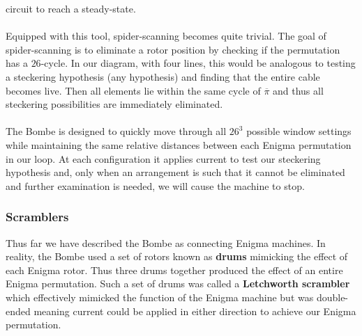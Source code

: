 circuit to reach
a steady-state.
\\\\Equipped with this tool, spider-scanning becomes quite trivial.
The goal of spider-scanning is to eliminate a rotor position by
checking if the permutation has a $26$-cycle. In our diagram, with four lines,
this would be analogous to testing a steckering hypothesis (any
hypothesis) and finding that the entire cable becomes live. Then all
elements lie within the same cycle of $\overline\pi$ and thus all
steckering possibilities are immediately eliminated.
\\\\The Bombe is designed to quickly move through all $26^3$ possible
window settings while maintaining the same relative distances between
each Enigma permutation in our loop. At each configuration
it applies current to test our steckering hypothesis and, only when
an arrangement is such that it
cannot be eliminated and further examination is needed, we will cause
the machine to stop.

\subsubsection{Scramblers}
Thus far we have described the Bombe as connecting Enigma machines.
In reality, the Bombe used a set of rotors known as {\bf{drums}}
mimicking the effect of each Enigma rotor. Thus three drums together
produced the effect of an entire Enigma permutation. Such a set of
drums was called a {\bf{Letchworth scrambler}} which effectively
mimicked the function of the Enigma machine but was double-ended
meaning current could be applied in either direction to achieve our
Enigma permutation.

